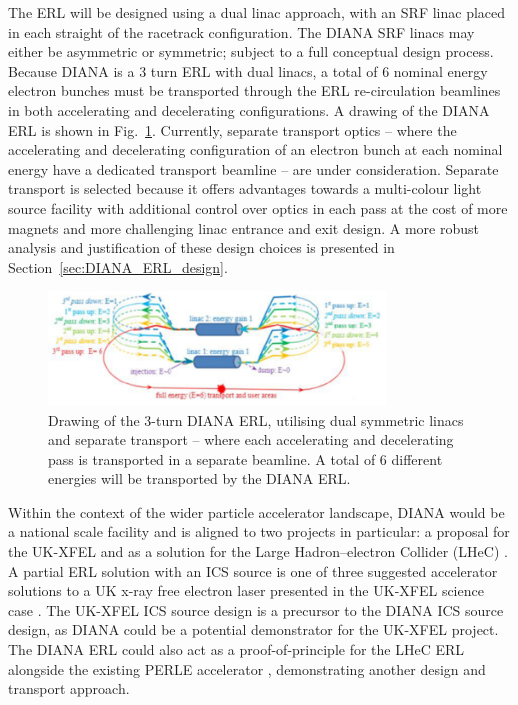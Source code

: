 \documentclass[../main.tex]{subfiles}
\begin{document}
The ERL will be designed using a dual linac approach, with an SRF linac placed in each straight of the racetrack configuration. The DIANA SRF linacs may either be asymmetric or symmetric; subject to a full conceptual design process. Because DIANA is a 3 turn ERL with dual linacs, a total of 6 nominal energy electron bunches must be transported through the ERL re-circulation beamlines in both accelerating and decelerating configurations. A drawing of the DIANA ERL is shown in Fig.~\ref{fig:DIANA_ERL_diagram}. Currently, separate transport optics -- where the accelerating and decelerating configuration of an electron bunch at each nominal energy have a dedicated transport beamline -- are under consideration. Separate transport is selected because it offers advantages towards a multi-colour light source facility with additional control over optics in each pass at the cost of more magnets and more challenging linac entrance and exit design. A more robust analysis and justification of these design choices is presented in Section~\ref{sec:DIANA_ERL_design}. 
\begin{figure}[!h]
\centering
\includegraphics[width=0.8\textwidth]{Figures/DIANA_Inverse_Compton_Source_Design/DIANA_diagram_placeholder.pdf}
\caption{Drawing of the 3-turn DIANA ERL, utilising dual symmetric linacs and separate transport -- where each accelerating and decelerating pass is transported in a separate beamline. A total of 6 different energies will be transported by the DIANA ERL.}
\label{fig:DIANA_ERL_diagram}
\end{figure}
Within the context of the wider particle accelerator landscape, DIANA would be a national scale facility and is aligned to two projects in particular: a proposal for the UK-XFEL \cite{burnett2020uk} and as a solution for the Large Hadron--electron Collider (LHeC) \cite{valloni2013strawman,bruning2019exploring,holzer2021accelerator,agostini2021large}. A partial ERL solution with an ICS source is one of three suggested accelerator solutions to a UK x-ray free electron laser presented in the UK-XFEL science case \cite{burnett2020uk}. The UK-XFEL ICS source design is a precursor to the DIANA ICS source design, as DIANA could be a potential demonstrator for the UK-XFEL project. The DIANA ERL could also act as a proof-of-principle for the LHeC ERL alongside the existing PERLE accelerator \cite{angal2018perle}, demonstrating another design and transport approach.
\end{document}
